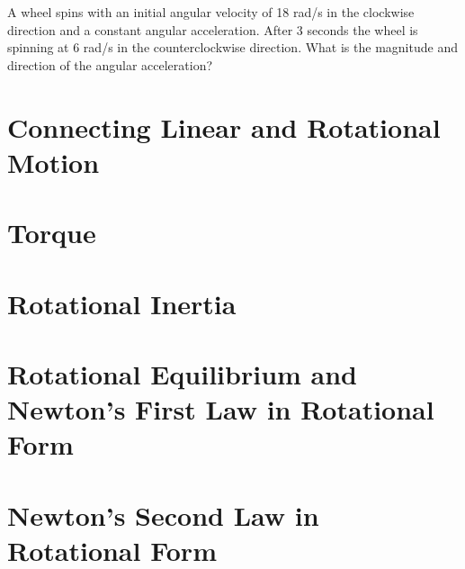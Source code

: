 \documentclass[../mech.tex]{subfiles}
\begin{document}
\ex A wheel spins with an initial angular velocity of 18 rad/s in the clockwise direction and a constant angular acceleration. After 3 seconds the wheel is spinning at 6 rad/s in the counterclockwise direction. What is the magnitude and direction of the angular acceleration?

\section{Connecting Linear and Rotational Motion}
\section{Torque}
\section{Rotational Inertia}
\section{Rotational Equilibrium and Newton's First Law in Rotational Form}
\section{Newton's Second Law in Rotational Form}
\end{document}
